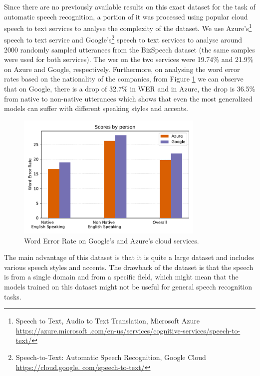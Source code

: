 Since there are no previously available results on this exact dataset for the task of automatic speech recognition, a portion of it was processed using popular cloud speech to text services to analyse the complexity of the dataset. We use Azure's\footnote{Speech to Text, Audio to Text Translation, Microsoft Azure \href{https://azure.microsoft.com/en-us/services/cognitive-services/speech-to-text/}{https://azure.microsoft .com/en-us/services/cognitive-services/speech-to-text/}} speech to text service and Google's\footnote{Speech-to-Text: Automatic Speech Recognition, Google Cloud \href{https://cloud.google.com/speech-to-text/}{https://cloud.google. com/speech-to-text/}} speech to text services to analyse around 2000 randomly sampled utterances from the BizSpeech dataset (the same samples were used for both services). The \acrfull{wer} on the two services were 19.74\% and 21.9\% on Azure and Google, respectively. Furthermore, on analysing the word error rates based on the nationality of the companies, from Figure \ref{fig:wer_cloud} we can observe that on Google, there is a drop of 32.7\% in WER and in Azure, the drop is 36.5\% from native to non-native utterances which shows that even the most generalized models can suffer with different speaking styles and accents. 

\begin{figure}[ht]
  \begin{center}
    \includegraphics[width=0.8\textwidth]{images/wer_cloud.pdf} 
    \caption{Word Error Rate on Google's and Azure's cloud services.}
    \label{fig:wer_cloud}
  \end{center}
\end{figure}


The main advantage of this dataset is that it is quite a large dataset and includes various speech styles and accents. The drawback of the dataset is that the speech is from a single domain and from a specific field, which might mean that the models trained on this dataset might not be useful for general speech recognition tasks.

